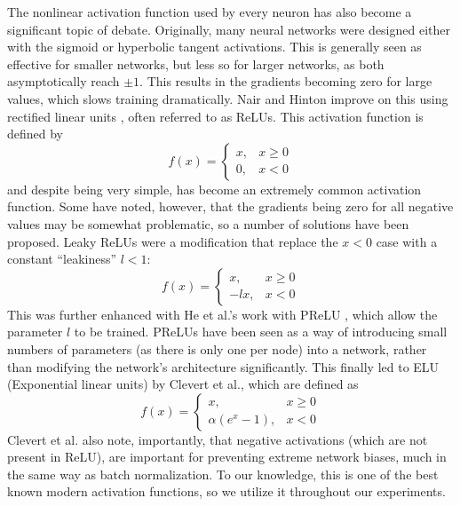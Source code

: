 The nonlinear activation function used by every neuron has also become a significant topic of debate.
Originally, many neural networks were designed either with the sigmoid or hyperbolic tangent activations.
This is generally seen as effective for smaller networks, but less so for larger networks, as both asymptotically reach $\pm 1$.
This results in the gradients becoming zero for large values, which slows training dramatically.
Nair and Hinton improve on this using rectified linear units \cite{nair2010rectified}, often referred to as ReLUs.
This activation function is defined by 
\[f(x) = \begin{cases}x, & x \geq 0 \\ 0, & x < 0\end{cases}\]
and despite being very simple, has become an extremely common activation function.
Some have noted, however, that the gradients being zero for all negative values may be somewhat problematic, so a number of solutions have been proposed.
Leaky ReLUs \cite{maas2013rectifier} were a modification that replace the $x < 0$ case with a constant ``leakiness'' $l < 1$:
\[f(x) = \begin{cases}x, & x \geq 0 \\-lx, & x < 0\end{cases}\]
This was further enhanced with He et al.'s work with PReLU \cite{he2015delving}, which allow the parameter $l$ to be trained.
PReLUs have been seen as a way of introducing small numbers of parameters (as there is only one per node) into a network, rather than modifying the network's architecture significantly.
This finally led to ELU (Exponential linear units) by Clevert et al., which are defined as
\[f(x) = \begin{cases}x, & x \geq 0 \\\alpha (e^x -1), & x < 0\end{cases}\]
Clevert et al. also note, importantly, that negative activations (which are not present in ReLU), are important for preventing extreme network biases, much in the same way as batch normalization.
To our knowledge, this is one of the best known modern activation functions, so we utilize it throughout our experiments.

